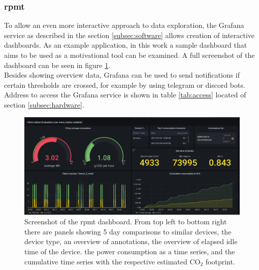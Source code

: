 \subsubsection{\acrfull{rpmt}}\label{subsec:RPMT}
To allow an even more interactive approach to data exploration, the Grafana service as described in the section \ref{subsec:software} allows creation of interactive dashboards. As an example application, in this work a sample dashboard that aims to be used as a motivational tool can be examined. A full screenshot of the dashboard can be seen in figure \ref{fig:dashboard}.\\
Besides showing overview data, Grafana can be used to send notifications if certain thresholds are crossed, for example by using telegram or discord bots. Address to access the Grafana service is shown in table \ref{tab:access} located of section \ref{subsec:hardware}.
\begin{figure}[h]
	\centering	
	\includegraphics[width=\textwidth]{images/RPMT.png}
	\caption{Screenshot of the \acrshort{rpmt} dashboard. From top left to bottom right there are panels showing 5 day comparisons to similar devices, the device type, an overview of annotations, the overview of elapsed idle time of the device. the power consumption as a time series, and the cumulative time series with the respective estimated CO$_2$ footprint.}
	\label{fig:dashboard}
\end{figure}